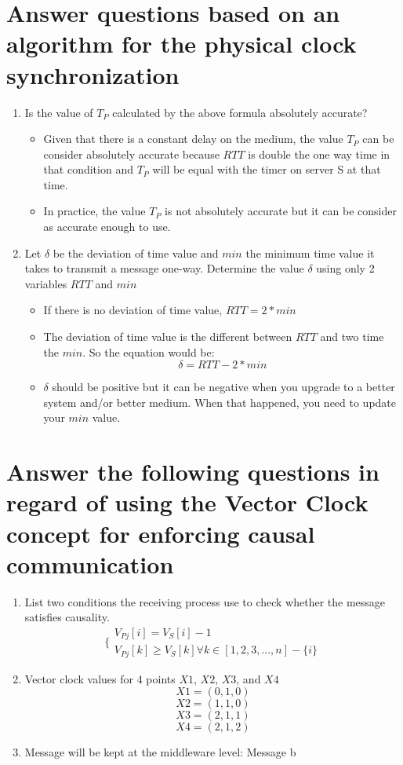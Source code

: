 \documentclass[11pt,a4paper]{article}
\begin{document}
\section{Answer questions based on an algorithm for the physical clock synchronization}
\begin{enumerate}[label=\alph*)]
	\item Is the value of $T_P$ calculated by the above formula absolutely accurate?
	\begin{itemize}
		\item Given that there is a constant delay on the medium, the value $T_P$ can be consider absolutely accurate because $RTT$ is double the one way time in that condition and $T_P$ will be equal with the timer on server S at that time.
		\item In practice, the value $T_P$ is not absolutely accurate but it can be consider as accurate enough to use.
	\end{itemize}
	\item Let $\delta$ be the deviation of time value and $min$ the minimum time value it takes to transmit a message one-way. Determine the value $\delta$ using only 2 variables $RTT$ and $min$
	\begin{itemize}
		\item If there is no deviation of time value, $RTT = 2*min$
		\item The deviation of time value is the different between $RTT$ and two time the $min$. So the equation would be:
		\[\delta = RTT - 2*min\]
		\item $\delta$ should be positive but it can be negative when you upgrade to a better system and/or better medium. When that happened, you need to update your $min$ value. 
	\end{itemize}
\end{enumerate}

\section{Answer the following questions in regard of using the Vector Clock concept for enforcing causal communication}
\begin{enumerate}[label=\alph*)]
	\item List  two  conditions  the receiving process use to check whether the message satisfies causality.
	\[\bigg\{
	\begin{matrix}
		V_{Pj}[i] = V_S[i] - 1\\
		V_{Pj}[k] \geq V_S[k] \forall k \in [1, 2, 3, ..., n] - \{i\}
	\end{matrix}
	\]
	\item Vector clock values for 4 points $X1$, $X2$, $X3$, and $X4$
	\[X1 = (0,1,0)\]
	\[X2 = (1,1,0)\]
	\[X3 = (2,1,1)\]
	\[X4 = (2,1,2)\]
	\item Message will be kept at the middleware level:
	Message b
\end{enumerate}
\end{document}
